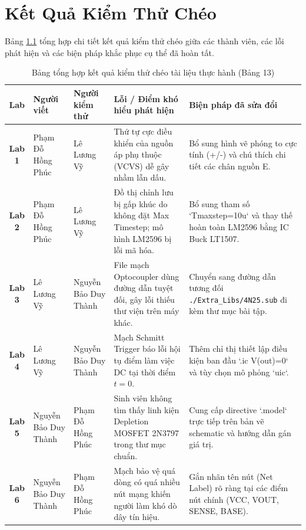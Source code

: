 \documentclass[12pt,a4paper]{report}
\begin{document}
\chapter{Kết Quả Kiểm Thử Chéo}

Bảng \ref{tab:kiem_thu_cheo} tổng hợp chi tiết kết quả kiểm thử chéo giữa các thành viên, các lỗi phát hiện và các biện pháp khắc phục cụ thể đã hoàn tất.

\begin{table}[H]
\centering
\caption{Bảng tổng hợp kết quả kiểm thử chéo tài liệu thực hành (Bảng 13)}
\label{tab:kiem_thu_cheo}
\renewcommand{\arraystretch}{1.3}
\small
\begin{tabularx}{\textwidth}{|c|p{2.8cm}|p{2.8cm}|X|p{4.2cm}|}
\hline
\rowcolor{codebg}
\textbf{Lab} & \textbf{Người viết} & \textbf{Người kiểm thử} & \textbf{Lỗi / Điểm khó hiểu phát hiện} & \textbf{Biện pháp đã sửa đổi} \\ \hline
\textbf{Lab 1} & Phạm Đỗ Hồng Phúc & Lê Lương Vỹ & Thứ tự cực điều khiển của nguồn áp phụ thuộc (VCVS) dễ gây nhầm lẫn dấu. & Bổ sung hình vẽ phóng to cực tính (+/-) và chú thích chi tiết các chân nguồn E. \\ \hline
\textbf{Lab 2} & Phạm Đỗ Hồng Phúc & Lê Lương Vỹ & Đồ thị chỉnh lưu bị gấp khúc do không đặt Max Timestep; mô hình LM2596 bị lỗi mã hóa. & Bổ sung tham số `Tmaxstep=10u` và thay thế hoàn toàn LM2596 bằng IC Buck LT1507. \\ \hline
\textbf{Lab 3} & Lê Lương Vỹ & Nguyễn Bảo Duy Thành & File mạch Optocoupler dùng đường dẫn tuyệt đối, gây lỗi thiếu thư viện trên máy khác. & Chuyển sang đường dẫn tương đối \texttt{./Extra\_Libs/4N25.sub} đi kèm thư mục bài tập. \\ \hline
\textbf{Lab 4} & Lê Lương Vỹ & Nguyễn Bảo Duy Thành & Mạch Schmitt Trigger báo lỗi hội tụ điểm làm việc DC tại thời điểm $t=0$. & Thêm chỉ thị thiết lập điều kiện ban đầu `.ic V(out)=0` và tùy chọn mô phỏng `uic`. \\ \hline
\textbf{Lab 5} & Nguyễn Bảo Duy Thành & Phạm Đỗ Hồng Phúc & Sinh viên không tìm thấy linh kiện Depletion MOSFET 2N3797 trong thư mục chuẩn. & Cung cấp directive `.model` trực tiếp trên bản vẽ schematic và hướng dẫn gán giá trị. \\ \hline
\textbf{Lab 6} & Nguyễn Bảo Duy Thành & Phạm Đỗ Hồng Phúc & Mạch bảo vệ quá dòng có quá nhiều nút mạng khiến người làm khó dò dây tín hiệu. & Gắn nhãn tên nút (Net Label) rõ ràng tại các điểm nút chính (VCC, VOUT, SENSE, BASE). \\ \hline
\end{tabularx}
\end{table}
\end{document}
